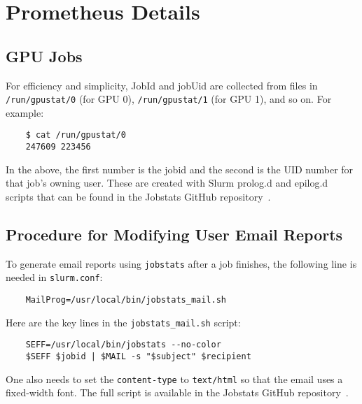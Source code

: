 \appendix

\section{Prometheus Details}

\subsection{GPU Jobs}
\label{appendix_gpu_jobs}

For efficiency and simplicity, JobId and jobUid are collected from files in \texttt{/run/gpustat/0} (for GPU 0), \texttt{/run/gpustat/1} (for GPU 1), and so on. For example:

\begin{verbatim}
    $ cat /run/gpustat/0
    247609 223456
\end{verbatim}

\noindent
In the above, the first number is the jobid and the second is the UID number for that job's owning user. These are created with Slurm prolog.d and epilog.d scripts that can be found in the Jobstats GitHub repository~\cite{prolog_epilog}.

\subsection{Procedure for Modifying User Email Reports}
\label{replace_seff}
To generate email reports using \texttt{jobstats} after a job finishes, the following line is needed in \texttt{slurm.conf}:

\begin{verbatim}
    MailProg=/usr/local/bin/jobstats_mail.sh
\end{verbatim}

\noindent
Here are the key lines in the \texttt{jobstats\_mail.sh} script:

\begin{verbatim}
    SEFF=/usr/local/bin/jobstats --no-color
    $SEFF $jobid | $MAIL -s "$subject" $recipient
\end{verbatim}

\noindent
One also needs to set the \texttt{content-type} to \texttt{text/html} so that the email uses a fixed-width font.
The full script is available in the Jobstats GitHub repository~\cite{mail_script}.
